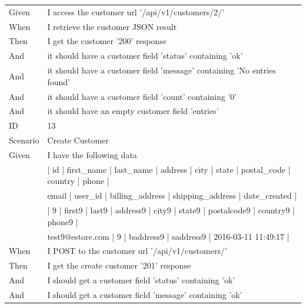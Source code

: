 \documentclass{report}
\begin{document}
\begin{tabular}{ l l }
Given 		& I access the customer url '/api/v1/customers/2/' \\
When 		& I retrieve the customer JSON result \\
Then 		& I get the customer '200' response \\
And			& it should have a customer field 'status' containing 'ok' \\
And 			& it should have a customer field 'message' containing 'No entries found' \\
And 			& it should have a customer field 'count' containing '0' \\
And 			& it should have an empty customer field 'entries' \\
ID 			& 13 \\
Scenario		& Create Customer \\
Given 		& I have the following data \\
   			& | id | first\_name | last\_name | address | city | state | postal\_code | country | phone | \\
   			&  email | user\_id | billing\_address | shipping\_address | date\_created | \\
  			& | 9 | first9 | last9 | address9 | city9 | state9 | postalcode9 | country9 | phone9 | \\
  			& test9@estore.com | 9 | baddress9 | saddress9 | 2016-03-11 11:49:17 | \\
When 		& I POST to the customer url '/api/v1/customers/' \\
Then 		& I get the create customer '201' response \\
And			& I should get a customer field 'status' containing 'ok' \\
And 			& I should get a customer field 'message' containing 'ok' \\
\end{tabular}
\newpage
\end{document}
